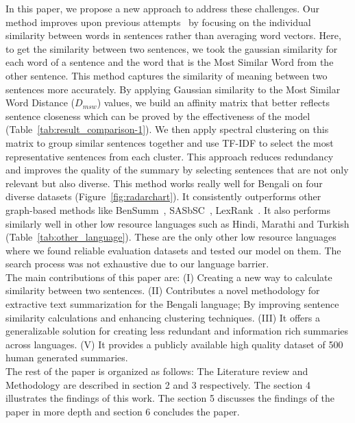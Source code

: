 In this paper, we propose a new approach to address these challenges.
Our method improves upon previous
attempts~\cite{roychowdhury-etal-2022-spectral-base}
by focusing on the individual similarity between words
in sentences rather than averaging word vectors.
Here, to get the similarity between two sentences,
we took the gaussian similarity for each word of a sentence and
the word that is the Most Similar Word from the other sentence.
This method captures the similarity of meaning between
two sentences more accurately.
By applying Gaussian similarity to the Most Similar
Word Distance ($D_{msw}$) values, we build an affinity matrix that
better reflects sentence closeness which can be proved
by the effectiveness of the model (Table~\ref{tab:result_comparison-1}).
We then apply spectral clustering on this matrix to
group similar sentences together and use TF-IDF to select the
most representative sentences from each cluster.
This approach reduces redundancy and improves the
quality of the summary by selecting sentences that are not only
relevant but also diverse.
This method works really well for Bengali on four
diverse datasets (Figure~\ref{fig:radarchart}).
It consistently outperforms other graph-based methods
like BenSumm~\cite{chowdhury-etal-2021-tfidf-clustering},
SASbSC~\cite{roychowdhury-etal-2022-spectral-base},
LexRank~\cite{Erkan-lexRank-2004}.
It also performs similarly well in other low resource languages such as
Hindi, Marathi and Turkish (Table~\ref{tab:other_language}).
These are the only other low resource languages
where we found reliable evaluation datasets and tested our model on them.
The search process was not exhaustive due to our language barrier.\\

The main contributions of this paper are:
(I) Creating a new way to calculate similarity
between two sentences.
(II) Contributes a novel methodology for extractive
text summarization for the Bengali language;
By improving sentence similarity calculations and
enhancing clustering techniques.
(III)  It offers a generalizable solution for creating less
redundant and information rich summaries across languages.
(V) It provides a publicly available high quality dataset
of 500 human generated summaries.\\

The rest of the paper is organized as follows:
The Literature review and Methodology are described in
section 2 and 3 respectively.
The section 4 illustrates the findings of this work.
The section 5 discusses the findings of the paper in more depth
and section 6 concludes the paper.